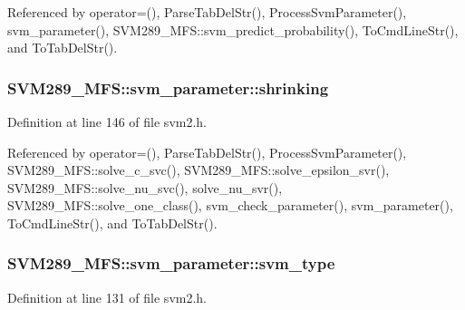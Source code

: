 Referenced by operator=(), Parse\+Tab\+Del\+Str(), Process\+Svm\+Parameter(), svm\+\_\+parameter(), S\+V\+M289\+\_\+\+M\+F\+S\+::svm\+\_\+predict\+\_\+probability(), To\+Cmd\+Line\+Str(), and To\+Tab\+Del\+Str().

\subsubsection[{\texorpdfstring{shrinking}{shrinking}}]{ S\+V\+M289\+\_\+\+M\+F\+S\+::svm\+\_\+parameter\+::shrinking}\hypertarget{struct_s_v_m289___m_f_s_1_1svm__parameter_aee00cd2472bcdd191d7616750078e3f8}{}\label{struct_s_v_m289___m_f_s_1_1svm__parameter_aee00cd2472bcdd191d7616750078e3f8}


Definition at line 146 of file svm2.\+h.



Referenced by operator=(), Parse\+Tab\+Del\+Str(), Process\+Svm\+Parameter(), S\+V\+M289\+\_\+\+M\+F\+S\+::solve\+\_\+c\+\_\+svc(), S\+V\+M289\+\_\+\+M\+F\+S\+::solve\+\_\+epsilon\+\_\+svr(), S\+V\+M289\+\_\+\+M\+F\+S\+::solve\+\_\+nu\+\_\+svc(), solve\+\_\+nu\+\_\+svr(), S\+V\+M289\+\_\+\+M\+F\+S\+::solve\+\_\+one\+\_\+class(), svm\+\_\+check\+\_\+parameter(), svm\+\_\+parameter(), To\+Cmd\+Line\+Str(), and To\+Tab\+Del\+Str().

\subsubsection[{\texorpdfstring{svm\+\_\+type}{svm_type}}]{ S\+V\+M289\+\_\+\+M\+F\+S\+::svm\+\_\+parameter\+::svm\+\_\+type}\hypertarget{struct_s_v_m289___m_f_s_1_1svm__parameter_a803dee598ce609cc4ccb4fdbfa99cd1b}{}\label{struct_s_v_m289___m_f_s_1_1svm__parameter_a803dee598ce609cc4ccb4fdbfa99cd1b}


Definition at line 131 of file svm2.\+h.



